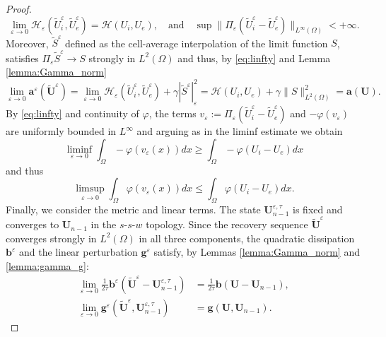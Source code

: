 \documentclass[a4paper,11pt]{article}
\theoremstyle{definition}
\numberwithin{equation}{section}
\newcommand{\e}{\varepsilon}
\begin{document}
\begin{proof}
	\begin{equation}
		\label{eq:linfty}
		\lim_{\e \to 0}\mathcal{H}_\e(\widetilde{U}_{i}^{\e}, \widetilde{U}_{e}^{\e}) = \mathcal{H}(U_i,U_e),\quad \text{and}\quad \sup \| \Pi_\e (\widetilde{U}_{i}^{\e}- \widetilde{U}_{e}^{\e})\|_{L^{\infty}(\Omega)} <+\infty.
	\end{equation}
	Moreover, $\widetilde{S}^{\e}$ defined as the cell-average interpolation of the limit function $S$, satisfies $\Pi_\e \widetilde{S}^\e \to S$ strongly in $L^2(\Omega)$ and thus, by \eqref{eq:linfty} and Lemma \ref{lemma:Gamma_norm}
	\begin{equation*}
		\lim_{\e \to 0}  \mathbf{a}^\e(\widetilde{\mathbf{U}}^{\e}) = \lim_{\e \to 0} \mathcal{H}_\e(\widetilde{U}_{i}^{\e}, \widetilde{U}_{e}^{\e}) + \gamma|\widetilde{S}^\e|_\e^2= \mathcal{H}(U_{i}, U_{e}) + \gamma\|S\|_{L^2(\Omega)}^2=   \mathbf{a}(\mathbf{U}).
	\end{equation*}
	By \eqref{eq:linfty} and continuity of $\varphi$, the terms $v_\e:=\Pi_\e (\widetilde{U}_{i}^{\e}- \widetilde{U}_{e}^{\e})$ and $-\varphi(v_\e)$ are uniformly bounded in $L^\infty$ and arguing as in the liminf estimate we obtain
	\begin{equation*}
		\liminf_{\e \to 0} \int_\Omega -\varphi(v_\e(x))dx \geq \int_\Omega -\varphi(U_i - U_e) dx
	\end{equation*}
	and thus
	\[
	\limsup_{\e \to 0} \int_\Omega \varphi(v_\e(x))dx \leq \int_\Omega \varphi(U_i - U_e) dx.
	\]
	Finally, we consider the metric and linear terms. The state $\mathbf{U}_{n-1}^{\e,\tau}$ is fixed and converges to $\mathbf{U}_{n-1}$ in the $s$-$s$-$w$ topology. Since the recovery sequence $\widetilde{\mathbf{U}}^{\e}$ converges strongly in $L^2(\Omega)$ in all three components, the quadratic dissipation $\mathbf{b}^\e$ and the linear perturbation $\mathbf{g}^\e$ satisfy, by Lemmas \ref{lemma:Gamma_norm} and \ref{lemma:gamma_g}:
	\begin{align*}
		\lim_{\e \to 0} \frac{1}{2\tau} \mathbf{b}^\e(\widetilde{\mathbf{U}}^{\e} - \mathbf{U}_{n-1}^{\e,\tau}) &= \frac{1}{2\tau} \mathbf{b}(\mathbf{U} - \mathbf{U}_{n-1}), \\
		\lim_{\e \to 0} \mathbf{g}^\e(\widetilde{\mathbf{U}}^{\e}, \mathbf{U}_{n-1}^{\e,\tau}) &= \mathbf{g}(\mathbf{U}, \mathbf{U}_{n-1}).
	\end{align*}
\end{proof}
\end{document}

